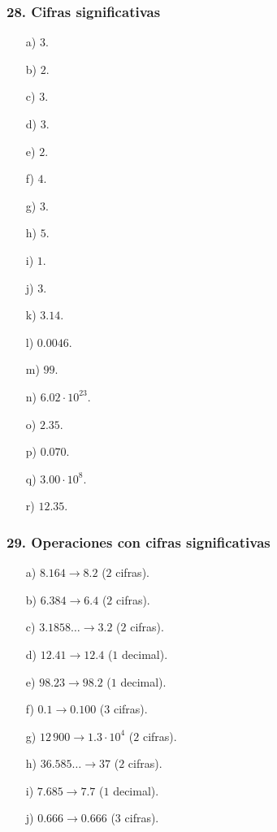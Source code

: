 \subsubsection*{28. Cifras significativas}
\begin{enumerate}
    \item[a)] $3$.
    \item[b)] $2$.
    \item[c)] $3$.
    \item[d)] $3$.
    \item[e)] $2$.
    \item[f)] $4$.
    \item[g)] $3$.
    \item[h)] $5$.
    \item[i)] $1$.
    \item[j)] $3$.
    \item[k)] $3.14$.
    \item[l)] $0.0046$.
    \item[m)] $99$.
    \item[n)] $6.02\cdot10^{23}$.
    \item[o)] $2.35$.
    \item[p)] $0.070$.
    \item[q)] $3.00\cdot10^8$.
    \item[r)] $12.35$.
\end{enumerate}

\subsubsection*{29. Operaciones con cifras significativas}
\begin{enumerate}
    \item[a)] $8.164\rightarrow8.2$ ($2$ cifras).
    \item[b)] $6.384\rightarrow6.4$ ($2$ cifras).
    \item[c)] $3.1858\ldots\rightarrow3.2$ ($2$ cifras).
    \item[d)] $12.41\rightarrow12.4$ ($1$ decimal).
    \item[e)] $98.23\rightarrow98.2$ ($1$ decimal).
    \item[f)] $0.1\rightarrow0.100$ ($3$ cifras).
    \item[g)] $12\,900\rightarrow1.3\cdot10^4$ ($2$ cifras).
    \item[h)] $36.585\ldots\rightarrow37$ ($2$ cifras).
    \item[i)] $7.685\rightarrow7.7$ ($1$ decimal).
    \item[j)] $0.666\rightarrow0.666$ ($3$ cifras).
\end{enumerate}


